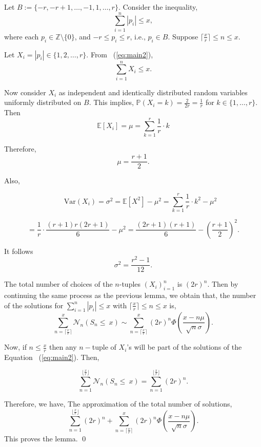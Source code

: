 \documentclass[11pt]{amsart}
\renewenvironment{proof}{{\bfseries Proof.}}{\qed}
\numberwithin{equation}{section}
\newcommand{\eqnref}[1]{~{\textrm(\ref{#1})}}
\numberwithin{equation}{section}
\begin{document}
	 \begin{proof} 	
	 	Let $B:=\{-r,-r+1,\dots,-1,1,\dots,r\}$. 	Consider the inequality,
	 	\begin{equation} \label{eq:main2}
	 		\sum_{i=1}^{n} |p_i| \leq x,
	 	\end{equation}
	 	where each \( p_i \in \mathbb{Z} \setminus \{0\} \), and \( -r \leq p_i \leq r \), i.e., \( p_i \in B \). Suppose $\lceil\frac{x}{r}\rceil \leq n\leq x. $
	 	
	 	Let \( X_i = |p_i| \in \{1, 2, \dots, r\} \). From \eqnref{eq:main2}, 
	 	\[
	 	\sum_{i=1}^n X_i \leq x.
	 	\]
	 	
	 	Now consider \( X_i \) as independent and identically distributed random variables uniformly distributed on \(B \). This implies,  $\mathbb{P}(X_{i}=k)=\frac{2}{2r}=\frac{1}{r}$ for $k\in \{1,\dots,r\}$. Then
	 	\[
	 	\mathbb{E}[X_i] = \mu = \sum_{k=1}^{r} \frac{1}{r}\cdot k 
	 	\]
	 
	 	Therefore,	\[{\mu=\frac{r+1}{2}}.\]
	 	
	 	
	 	
	 	
	 	Also,
	 	
	 	\[ \qquad \mathrm{Var}(X_i) = \sigma^2 = \mathbb{E}[X^{2}]-\mu^{2}=\sum_{k=1}^{r} \frac{1}{r}\cdot k^{2} -\mu^{2}\]
	 	
	 	\[
	 	= \frac{1}{r} \cdot \frac{(r+1)r(2r + 1)}{6}  -\mu^{2}= \frac{(2r+ 1)(r+1)}{6} -\left( \frac{r+1}{2} \right)^2.
	 	\]
	 	

    It follows 	 	\[
	 	{
	 		\sigma^{2}=\frac{r^{2}-1}{12}.
	 	}
	 	\]
	 	
	 	
	 The total number of choices of the $n$-tuples  $(X_i)_{i=1}^{n}$ is $(2r)^{n}.$ Then
	 	by continuing the same process as the previous lemma, we obtain that, 
	 	 	the number of the solutions for $\sum_{i=1}^{n}|p_{i}|\leq x$ with $\lceil \frac{x}{r}\rceil\leq n\leq x$ is,
	 	\[ {\sum_{n=\lceil \frac{x}{r}\rceil}^{x}\mathcal{N}_{n}(S_n \leq ~x)}\sim{\sum_{n=\lceil \frac{x}{r}\rceil}^{x}(2r)^{n}\Phi\left(\frac{x-n\mu}{\sqrt{n}\sigma}\right)}. \]
	 	
	 	Now, if $n\leq \frac{x}{r}$ then any $n-$tuple of $X_{i}$'s will be part of the solutions of the Equation \eqnref{eq:main2}. Then,
	 	
	 	\[{\sum_{n=1}^{\lfloor \frac{x}{r}\rfloor}\mathcal{N}_{n}(S_n \leq ~x)}=\sum_{n=1}^{\lfloor \frac{x}{r}\rfloor}(2r)^{n}.\]
	 	
	 	Therefore, we have,
	 	The approximation of the total number of solutions,
	 	\[\sum_{n=1}^{\lfloor \frac{x}{r}\rfloor}(2r)^{n}+{\sum_{n=\lceil \frac{x}{r}\rceil}^{x}(2r)^{n}\Phi\left(\frac{x-n\mu}{\sqrt{n}\sigma}\right)} .\]
        This proves the lemma. 
	 \end{proof}
	 
\end{document}

